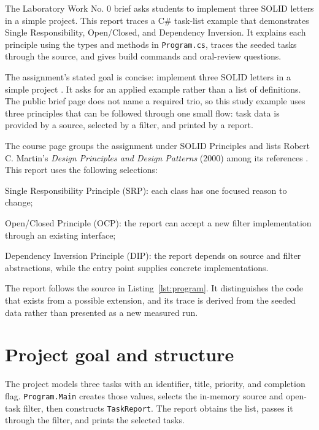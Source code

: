 \documentclass{utmreport}
\begin{document}
\makeutmreporttitlepage
\tableofcontents

\begin{utmabstract}[Abstract]
The Laboratory Work No. 0 brief asks students to implement three SOLID letters in a simple project. This report traces a C\# task-list example that demonstrates Single Responsibility, Open/Closed, and Dependency Inversion. It explains each principle using the types and methods in \texttt{Program.cs}, traces the seeded tasks through the source, and gives build commands and oral-review questions.

\end{utmabstract}

\utmintroduction
The assignment's stated goal is concise: implement three SOLID letters in a simple project \cite{assignment}. It asks for an applied example rather than a list of definitions. The public brief page does not name a required trio, so this study example uses three principles that can be followed through one small flow: task data is provided by a source, selected by a filter, and printed by a report.

The course page groups the assignment under SOLID Principles and lists Robert C. Martin's \textit{Design Principles and Design Patterns} (2000) among its references \cite{course,martin}. This report uses the following selections:
\begin{utmenumerate}
\item Single Responsibility Principle (SRP): each class has one focused reason to change;
\item Open/Closed Principle (OCP): the report can accept a new filter implementation through an existing interface;
\item Dependency Inversion Principle (DIP): the report depends on source and filter abstractions, while the entry point supplies concrete implementations.
\end{utmenumerate}

The report follows the source in Listing~\ref{lst:program}. It distinguishes the code that exists from a possible extension, and its trace is derived from the seeded data rather than presented as a new measured run.

\chapter{Project goal and structure}
The project models three tasks with an identifier, title, priority, and completion flag. \texttt{Program.Main} creates those values, selects the in-memory source and open-task filter, then constructs \texttt{TaskReport}. The report obtains the list, passes it through the filter, and prints the selected tasks.
\end{document}
